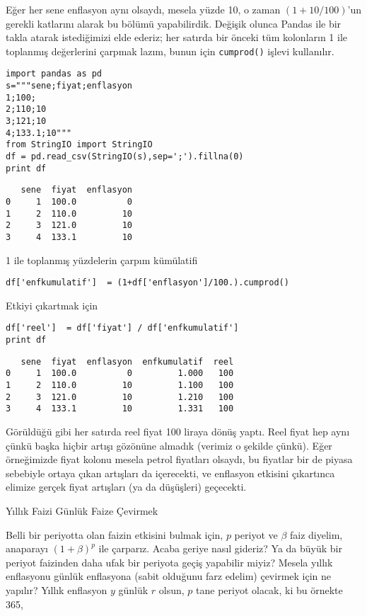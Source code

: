 \documentclass[12pt,fleqn]{article}\usepackage{../../common}
\begin{document}
Eğer her sene enflasyon aynı olsaydı, mesela yüzde 10, o zaman
$(1+10/100)$'un gerekli katlarını alarak bu bölümü yapabilirdik. Değişik
olunca Pandas ile bir takla atarak istediğimizi elde ederiz; her satırda
bir önceki tüm kolonların 1 ile toplanmış değerlerini çarpmak lazım, bunun
için \verb!cumprod()! işlevi kullanılır.

\begin{verbatim}
import pandas as pd
s="""sene;fiyat;enflasyon
1;100;
2;110;10   
3;121;10   
4;133.1;10"""
from StringIO import StringIO
df = pd.read_csv(StringIO(s),sep=';').fillna(0)
print df
\end{verbatim}

\begin{verbatim}
   sene  fiyat  enflasyon
0     1  100.0          0
1     2  110.0         10
2     3  121.0         10
3     4  133.1         10
\end{verbatim}

1 ile toplanmış yüzdelerin çarpım kümülatifi

\begin{verbatim}
df['enfkumulatif']  = (1+df['enflasyon']/100.).cumprod()
\end{verbatim}

Etkiyi çıkartmak için

\begin{verbatim}
df['reel']  = df['fiyat'] / df['enfkumulatif']
print df
\end{verbatim}

\begin{verbatim}
   sene  fiyat  enflasyon  enfkumulatif  reel
0     1  100.0          0         1.000   100
1     2  110.0         10         1.100   100
2     3  121.0         10         1.210   100
3     4  133.1         10         1.331   100
\end{verbatim}

Görüldüğü gibi her satırda reel fiyat 100 liraya dönüş yaptı. Reel fiyat
hep aynı çünkü başka hiçbir artışı gözönüne almadık (verimiz o şekilde
çünkü). Eğer örneğimizde fiyat kolonu mesela petrol fiyatları olsaydı, bu
fiyatlar bir de piyasa sebebiyle ortaya çıkan artışları da içerecekti, ve
enflasyon etkisini çıkartınca elimize gerçek fiyat artışları (ya da
düşüşleri) geçecekti.

Yıllık Faizi Günlük Faize Çevirmek

Belli bir periyotta olan faizin etkisini bulmak için, $p$ periyot ve $\beta$
faiz diyelim, anaparayı $(1+\beta)^p$ ile çarparız. Acaba geriye nasıl gideriz?
Ya da büyük bir periyot faizinden daha ufak bir periyota geçiş yapabilir miyiz?
Mesela yıllık enflasyonu günlük enflasyona (sabit olduğunu farz edelim) çevirmek
için ne yapılır? Yıllık enflasyon $y$ günlük $r$ olsun, $p$ tane periyot olacak,
ki bu örnekte 365,
\end{document}
